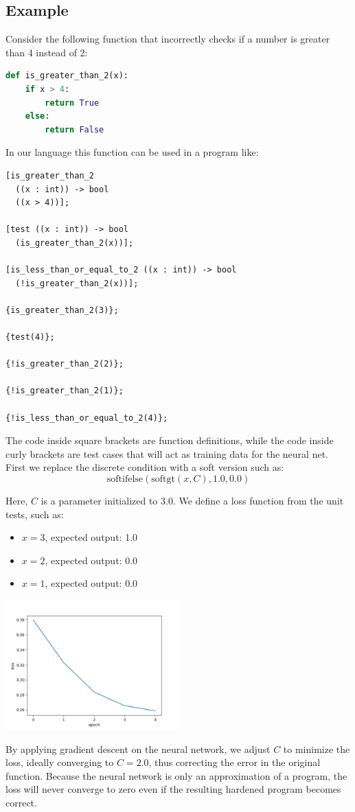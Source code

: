 \documentclass{article}
\begin{document}
\subsection{Example}
\indent Consider the following function that incorrectly checks if a number is greater than 4 instead of 2:
\begin{lstlisting}[language=Python]
def is_greater_than_2(x):
    if x > 4:
        return True
    else:
        return False
\end{lstlisting}
\indent In our language this function can be used in a program like:
\begin{verbatim}
[is_greater_than_2
  ((x : int)) -> bool
  ((x > 4))];

[test ((x : int)) -> bool
  (is_greater_than_2(x))];

[is_less_than_or_equal_to_2 ((x : int)) -> bool
  (!is_greater_than_2(x))];

{is_greater_than_2(3)};

{test(4)};

{!is_greater_than_2(2)};

{!is_greater_than_2(1)};

{!is_less_than_or_equal_to_2(4)};
\end{verbatim}
\indent The code inside square brackets are function definitions, while the code inside curly brackets are test cases that will act as training data for the neural net. First we replace the discrete condition with a soft version such as:
\begin{equation}
  \text{softifelse}(\text{softgt}(x, C), 1.0, 0.0)
\end{equation}

\indent Here, $C$ is a parameter initialized to 3.0. We define a loss function from the unit tests, such as:

\begin{itemize}
    \item $x = 3$, expected output: 1.0
    \item $x = 2$, expected output: 0.0
    \item $x = 1$, expected output: 0.0
\end{itemize}
\begin{center}
  \includegraphics[width=0.5\textwidth]{graph.png}
\end{center}
\indent By applying gradient descent on the neural network, we adjust $C$ to minimize the loss, ideally converging to $C = 2.0$, thus correcting the error in the original function. Because the neural network is only an approximation of a program, the loss will never converge to zero even if the resulting hardened program becomes correct.
\end{document}
